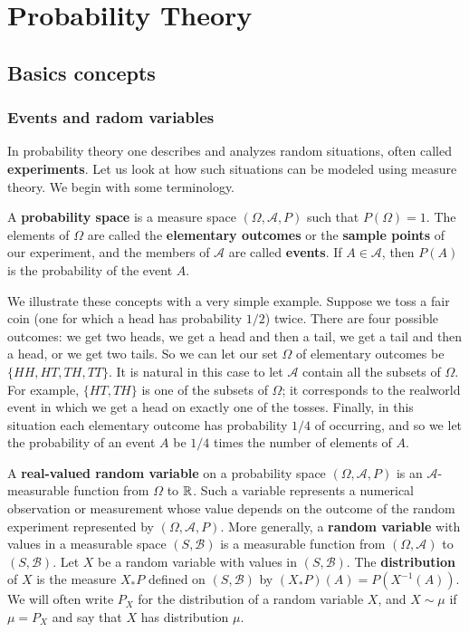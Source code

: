 \chapter{Probability Theory}
\section{Basics concepts}
\subsection{Events and radom variables}
In probability theory one describes and analyzes random situations, often called \textbf{experiments}. Let us look at how such situations can be modeled using measure theory. We begin with some terminology.\par
A \textbf{probability space} is a measure space $(\Omega,\mathcal{A},P)$ such that $P(\Omega)=1$. The elements of $\Omega$ are called the \textbf{elementary outcomes} or the \textbf{sample points} of our experiment, and the members of $\mathcal{A}$ are called \textbf{events}. If $A\in\mathcal{A}$, then $P(A)$ is the probability of the event $A$.
\begin{example}
We illustrate these concepts with a very simple example. Suppose we toss a fair coin (one for which a head has probability $1/2$) twice. There are four possible outcomes: we get two heads, we get a head and then a tail, we get a tail and then a head, or we get two tails. So we can let our set $\Omega$ of elementary outcomes be $\{HH,HT,TH,TT\}$. It is natural in this case to let $\mathcal{A}$ contain all the subsets of $\Omega$. For example, $\{HT,TH\}$ is one of the subsets of $\Omega$; it corresponds to the realworld event in which we get a head on exactly one of the tosses. Finally, in this situation each elementary outcome has probability $1/4$ of occurring, and so we let the probability of an event $A$ be $1/4$ times the number of elements of $A$.
\end{example}
A \textbf{real-valued random variable} on a probability space $(\Omega,\mathcal{A},P)$ is an $\mathcal{A}$-measurable function from $\Omega$ to $\mathbb{R}$. Such a variable represents a numerical observation or measurement whose value depends on the outcome of the random experiment represented by $(\Omega,\mathcal{A},P)$. More generally, a \textbf{random variable} with values in a measurable space $(S,\mathcal{B})$ is a measurable function from $(\Omega,\mathcal{A})$ to $(S,\mathcal{B})$. Let $X$ be a random variable with values in $(S,\mathcal{B})$. The \textbf{distribution} of $X$ is the measure $X_*P$ defined on $(S,\mathcal{B})$ by $(X_*P)(A)=P(X^{-1}(A))$. We will often write $P_X$ for the distribution of a random variable $X$, and $X\sim\mu$ if $\mu=P_X$ and say that $X$ has distribution $\mu$.\par
